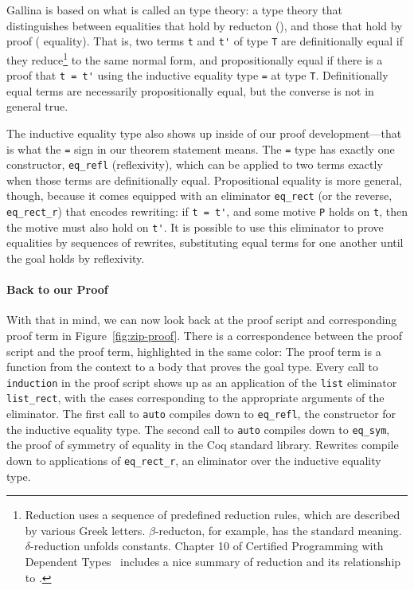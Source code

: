 Gallina is based on what is called an  type theory:
a type theory that distinguishes between equalities that hold by reducton (), and those that hold by proof ( equality).
That is, two terms \lstinline{t} and \lstinline{t'} of type \lstinline{T} are definitionally equal if they
reduce\footnote{Reduction uses a sequence of predefined reduction rules, which are described by various Greek letters. $\beta$-reducton, for example,
has the standard meaning. $\delta$-reduction unfolds constants. Chapter 10 of Certified Programming with Dependent Types~\cite{chlipala:cpdt} includes a nice summary of reduction and its relationship to .} 
to the same normal form,
and propositionally equal if there is a proof that \lstinline{t = t'} using the inductive
equality type \lstinline{=} at type \lstinline{T}. Definitionally equal terms are necessarily propositionally equal, but 
the converse is not in general true. %

The inductive equality type also shows up inside of our proof development---that is what the \lstinline{=} sign in our theorem statement means.
The \lstinline{=} type has exactly one constructor, \lstinline{eq_refl} (reflexivity), which can be applied to two terms exactly when those terms are definitionally equal.
Propositional equality is more general, though, because it comes equipped with an eliminator \lstinline{eq_rect} (or the reverse, \lstinline{eq_rect_r})
that encodes rewriting: if \lstinline{t = t'}, and some motive \lstinline{P} holds on \lstinline{t}, then the motive must also hold on \lstinline{t'}.
It is possible to use this eliminator to prove equalities by sequences of rewrites, substituting equal terms for one another until the goal holds by reflexivity.

\paragraph{Back to our Proof}

With that in mind, we can now look back at the proof script and corresponding proof term in Figure~\ref{fig:zip-proof}.
There is a correspondence between the proof script and the proof term, highlighted in the same color:
The proof term is a function from the context to a body that proves the goal type.
Every call to \lstinline{induction} in the proof script shows up as an application of the \lstinline{list} eliminator 
\lstinline{list_rect}, with the cases corresponding to the appropriate arguments of the eliminator.
The first call to \lstinline{auto} compiles down to \lstinline{eq_refl}, the constructor for the inductive equality type.
The second call to \lstinline{auto} compiles down to \lstinline{eq_sym}, the proof of symmetry of equality in the Coq standard library. %
Rewrites compile down to applications of \lstinline{eq_rect_r}, an eliminator over the inductive equality type.

